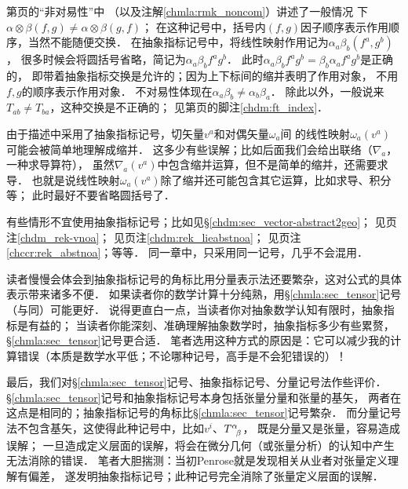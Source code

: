  第\pageref{chmla:sec_noncom}页的“非对易性”中
（以及注解\ref{chmla:rmk_noncom}）讲述了一般情况
下$\alpha \otimes \beta(f,g) \neq \alpha \otimes \beta(g,f)$；
在这种记号中，括号内$(f,g)$因子顺序表示作用顺序，当然不能随便交换．
在抽象指标记号中，将线性映射作用记为$\alpha _a \beta _b (f^a, g^b)$，
很多时候会将圆括号省略，简记为$\alpha _a \beta _b f^a g^b$．
此时$\alpha _a \beta _b f^a g^b=\beta_b \alpha_a f^a g^b$是正确的，
即带着抽象指标交换是允许的；因为上下标间的缩并表明了作用对象，
不用$f,g$的顺序表示作用对象．
不对易性体现在$\alpha _a \beta _b \neq \alpha_b \beta_a$．
除此以外，一般说来$T_{ab}\neq T_{ba}$，这种交换是不正确的；
见第\pageref{chdm:ft_index}页的脚注\ref{chdm:ft_index}．

 由于描述中采用了抽象指标记号，切矢量$v^a$和对偶矢量$\omega_a$间
的线性映射$\omega_a(v^a)$可能会被简单地理解成缩并．
这多少有些误解；比如后面我们会给出联络（$\nabla_a$，一种求导算符），
虽然$\nabla_a (v^a)$中包含缩并运算，但不是简单的缩并，还需要求导．
也就是说线性映射$\omega_a(v^a)$除了缩并还可能包含其它运算，比如求导、积分等；
此时最好不要省略圆括号了．


  有些情形不宜使用抽象指标记号；比如见\S \ref{chdm:sec_vector-abstract2geo}；
见\pageref{chdm_rek-vnoa}页注\ref{chdm_rek-vnoa}；
见\pageref{chdm:rek_lieabstnoa}页注\ref{chdm:rek_lieabstnoa}；
见\pageref{chccr:rek_abstnoa}页注\ref{chccr:rek_abstnoa}；等等．
同一章中，只采用同一记号，几乎不会混用．




读者慢慢会体会到抽象指标记号的角标比用分量表示法还要繁杂，这对公式的具体表示带来诸多不便．
如果读者你的数学计算十分纯熟，用\S\ref{chmla:sec_tensor}记号（与\parencite{cc2001-zh}同）可能更好．
说得更直白一点，当读者你对抽象数学认知有限时，抽象指标是有益的；
当读者你能深刻、准确理解抽象数学时，抽象指标多少有些累赘，\S\ref{chmla:sec_tensor}记号更合适．
笔者选用这种方式的原因是：它可以减少我的计算错误（本质是数学水平低；不论哪种记号，高手是不会犯错误的）！



最后，我们对\S\ref{chmla:sec_tensor}记号、抽象指标记号、分量记号法作些评价．
\S\ref{chmla:sec_tensor}记号和抽象指标记号本身包括张量分量和张量的基矢，
两者在这点是相同的；抽象指标记号的角标比\S\ref{chmla:sec_tensor}记号繁杂．
而分量记号法不包含基矢，这使得此种记号中，比如$v^i$、$T^\alpha_{\hphantom{\alpha}\beta}$，
既是分量又是张量，容易造成误解；
一旦造成定义层面的误解，将会在微分几何（或张量分析）的认知中产生无法消除的错误．
笔者大胆揣测：当初Penrose就是发现相关从业者对张量定义理解有偏差，
遂发明抽象指标记号；此种记号完全消除了张量定义层面的误解．


